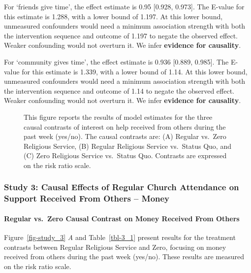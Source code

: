 \documentclass[
  single column]{article}
\let\oldparagraph\paragraph
\renewcommand{\paragraph}[1]{\oldparagraph{#1}\mbox{}}
\begin{document}
For `friends give time', the effect estimate is 0.95 {[}0.928, 0.973{]}.
The E-value for this estimate is 1.288, with a lower bound of 1.197. At
this lower bound, unmeasured confounders would need a minimum
association strength with both the intervention sequence and outcome of
1.197 to negate the observed effect. Weaker confounding would not
overturn it. We infer \textbf{evidence for causality}.

For `community gives time', the effect estimate is 0.936 {[}0.889,
0.985{]}. The E-value for this estimate is 1.339, with a lower bound of
1.14. At this lower bound, unmeasured confounders would need a minimum
association strength with both the intervention sequence and outcome of
1.14 to negate the observed effect. Weaker confounding would not
overturn it. We infer \textbf{evidence for causality}.

\begin{figure}


\caption{\label{fig-study2}This figure reports the results of model
estimates for the three causal contrasts of interest on help received
from others during the past week (yes/no). The causal contrasts are: (A)
Regular vs.~Zero Religious Service, (B) Regular Religious Service
vs.~Status Quo, and (C) Zero Religious Service vs.~Status Quo. Contrasts
are expressed on the risk ratio scale.}

\end{figure}%

\newpage{}

\subsubsection{Study 3: Causal Effects of Regular Church Attendance on
Support Received From Others --
Money}\label{study-3-causal-effects-of-regular-church-attendance-on-support-received-from-others-money}

\paragraph{Regular vs.~Zero Causal Contrast on Money Received From
Others}\label{regular-vs.-zero-causal-contrast-on-money-received-from-others}

Figure~\ref{fig-study_3} \emph{A} and Table~\ref{tbl-3_1} present
results for the treatment contrasts between Regular Religious Service
and Zero, focusing on money received from others during the past week
(yes/no). These results are measured on the risk ratio scale.
\end{document}
